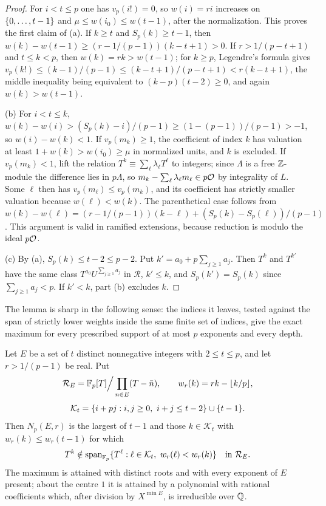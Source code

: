 \begin{proof}
For $i<t\le p$ one has $v_p(i!)=0$, so $w(i)=ri$ increases on $\{0,\dots,t-1\}$ and
$\mu\le w(i_0)\le w(t-1)$, after the normalization. This proves the first claim of (a). If
$k\ge t$ and $S_p(k)\ge t-1$, then $w(k)-w(t-1)\ge(r-1/(p-1))(k-t+1)>0$. If
$r>1/(p-t+1)$ and $t\le k<p$, then $w(k)=rk>w(t-1)$; for $k\ge p$, Legendre's formula gives
$v_p(k!)\le(k-1)/(p-1)\le(k-t+1)/(p-t+1)<r(k-t+1)$, the middle inequality being equivalent
to $(k-p)(t-2)\ge0$, and again $w(k)>w(t-1)$.

(b) For $i<t\le k$, $w(k)-w(i)>(S_p(k)-i)/(p-1)\ge(1-(p-1))/(p-1)>-1$, so $w(i)-w(k)<1$.
If $v_p(m_k)\ge1$, the coefficient of index $k$ has valuation at least
$1+w(k)>w(i_0)\ge\mu$ in normalized units, and $k$ is excluded. If $v_p(m_k)<1$, lift the
relation $T^k\equiv\sum_\ell\lambda_\ell T^\ell$ to integers; since $\Lambda$ is a free
$\mathbb{Z}$-module the difference lies in $p\Lambda$, so $m_k-\sum_\ell\lambda_\ell m_\ell\in p\mathcal{O}$
by integrality of $L$. Some $\ell$ then has $v_p(m_\ell)\le v_p(m_k)$, and its coefficient
has strictly smaller valuation because $w(\ell)<w(k)$. The parenthetical case follows from
$w(k)-w(\ell)=(r-1/(p-1))(k-\ell)+(S_p(k)-S_p(\ell))/(p-1)$. This argument is valid in
ramified extensions, because reduction is modulo the ideal $p\mathcal{O}$.

(c) By (a), $S_p(k)\le t-2\le p-2$. Put $k'=a_0+p\sum_{j\ge1}a_j$. Then $T^k$ and $T^{k'}$
have the same class $T^{a_0}U^{\sum_{j\ge1}a_j}$ in $\mathcal R$, $k'\le k$, and
$S_p(k')=S_p(k)$ since $\sum_{j\ge1}a_j<p$. If $k'<k$, part (b) excludes $k$.
\end{proof}

The lemma is sharp in the following sense: the indices it leaves, tested against the span
of strictly lower weights inside the same finite set of indices, give the exact maximum for
every prescribed support of at most $p$ exponents and every depth.

\begin{theorem}\label{smd:thm:rankrule}
Let $E$ be a set of $t$ distinct nonnegative integers with $2\le t\le p$, and let
$r>1/(p-1)$ be real. Put
\[
 \mathcal R_E=\mathbb{F}_p[T]\Big/\prod_{n\in E}(T-\bar n),\qquad
 w_r(k)=rk-\lfloor k/p\rfloor,
\]
\[
 \mathcal K_t=\{i+pj : i,j\ge0,\ i+j\le t-2\}\cup\{t-1\}.
\]
Then $N_p(E,r)$ is the largest of $t-1$ and those $k\in\mathcal K_t$ with
$w_r(k)\le w_r(t-1)$ for which
\begin{equation}\label{smd:eq:rankrule}
 T^k\notin\operatorname{span}_{\F_p}\set{T^\ell : \ell\in\mathcal K_t,\ w_r(\ell)<w_r(k)}
 \quad\text{in }\mathcal R_E .
\end{equation}
The maximum is attained with distinct roots and with every exponent of $E$ present; about
the centre $1$ it is attained by a polynomial with rational coefficients which, after
division by $X^{\min E}$, is irreducible over $\mathbb{Q}$.
\end{theorem}

